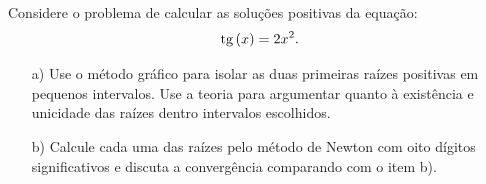 \begin{exer} Considere o problema de calcular as soluções positivas da equação:
  \begin{equation*}
    \operatorname{tg}\,(x)=2x^2.    
  \end{equation*}
\begin{itemize}
\item[a)] Use o método gráfico para isolar as duas primeiras raízes positivas em pequenos intervalos. Use a teoria para argumentar quanto à existência e unicidade das raízes dentro intervalos escolhidos.
\item[b)]  Calcule cada uma das raízes pelo método de Newton com oito dígitos significativos e discuta a convergência comparando com o item b).
\end{itemize}
\end{exer}
\ifisscilab
